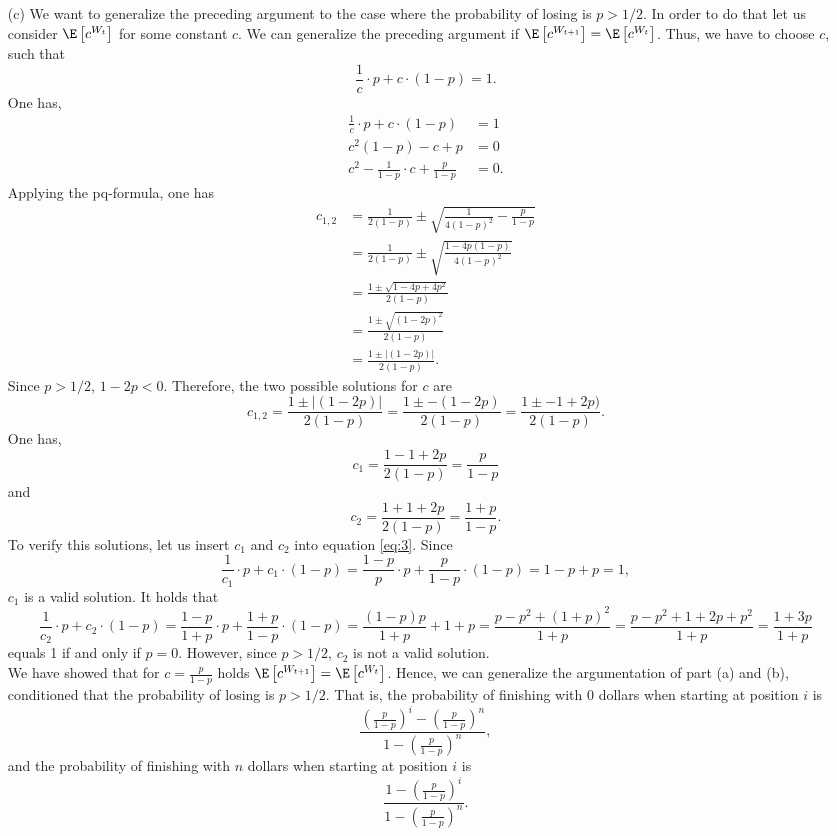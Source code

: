 \begin{enumerate}
  \item[(c)] We want to generalize the preceding argument to the case where the
  probability of losing is $p > 1/2$. In order to do that let us consider
  $\E\left[c^{W_t}\right]$ for some constant $c$. We can generalize the preceding
  argument if $\E\left[c^{W_{t+1}}\right] = \E\left[c^{W_t}\right]$. Thus, we
  have to choose $c$, such that
  \begin{equation}\label{eq:3}
    \frac{1}{c} \cdot p + c \cdot (1-p) = 1.
  \end{equation}
  One has,
  \begin{align*}
    \frac{1}{c} \cdot p + c \cdot (1-p) &= 1 \\
    c^2(1-p) - c + p                    &= 0 \\
    c^2 - \frac{1}{1-p} \cdot c + \frac{p}{1-p} &= 0.
  \end{align*}
  Applying the pq-formula, one has
  \begin{align*}
    c_{1,2}
      &= \frac{1}{2(1-p)} \pm \sqrt{\frac{1}{4(1-p)^2} - \frac{p}{1-p}} \\
      &= \frac{1}{2(1-p)} \pm \sqrt{\frac{1 - 4p(1-p)}{4(1-p)^2}} \\
      &= \frac{1 \pm \sqrt{1 - 4p + 4p^2}}{2(1-p)} \\
      &= \frac{1 \pm \sqrt{(1 - 2p)^2}}{2(1-p)} \\
      &= \frac{1 \pm |(1 - 2p)|}{2(1-p)}.
  \end{align*}
  Since $p > 1/2$, $1 - 2p < 0$. Therefore, the two possible solutions for $c$ are
  \[
    c_{1,2}
      = \frac{1 \pm |(1 - 2p)|}{2(1-p)}
      = \frac{1 \pm -(1 - 2p)}{2(1-p)}
      = \frac{1 \pm -1 + 2p)}{2(1-p)}.
  \]
  One has,
  \[ c_1 = \frac{1 - 1 + 2p}{2(1-p)} = \frac{p}{1-p} \]
  and
  \[ c_2 = \frac{1 + 1 + 2p}{2(1-p)} = \frac{1+p}{1-p}. \]
  To verify this solutions, let us insert $c_1$ and $c_2$ into equation
  \eqref{eq:3}. Since
  \[
    \frac{1}{c_1} \cdot p + c_1 \cdot (1-p)
      = \frac{1-p}{p} \cdot p + \frac{p}{1-p} \cdot (1-p)
      = 1 - p + p
      = 1,
  \]
  $c_1$ is a valid solution. It holds that
  \[
    \frac{1}{c_2} \cdot p + c_2 \cdot (1-p)
      = \frac{1-p}{1+p} \cdot p + \frac{1+p}{1-p} \cdot (1-p)
      = \frac{(1-p)p}{1+p} + 1 + p
      = \frac{p - p^2 + (1+p)^2}{1+p}
      = \frac{p - p^2 + 1 + 2p + p^2}{1+p}
      = \frac{1 + 3p}{1 + p}
  \]
  equals 1 if and only if $p = 0$. However, since $p > 1/2$, $c_2$ is not a valid
  solution. \\
  We have showed that for $c = \frac{p}{1-p}$ holds
  $\E\left[c^{W_{t+1}}\right] = \E\left[c^{W_t}\right]$. Hence, we can generalize
  the argumentation of part (a) and (b), conditioned that the probability of
  losing is $p > 1/2$. That is, the probability of finishing with 0 dollars when
  starting at position $i$ is
  \[  \frac{ \left(\frac{p}{1-p}\right)^i - \left(\frac{p}{1-p}\right)^n}{1 - \left(\frac{p}{1-p}\right)^n}, \]
  and the probability of finishing with $n$ dollars when starting at position
  $i$ is
  \[ \frac{1-\left(\frac{p}{1-p}\right)^i}{1-\left(\frac{p}{1-p}\right)^n}. \]

\end{enumerate}
